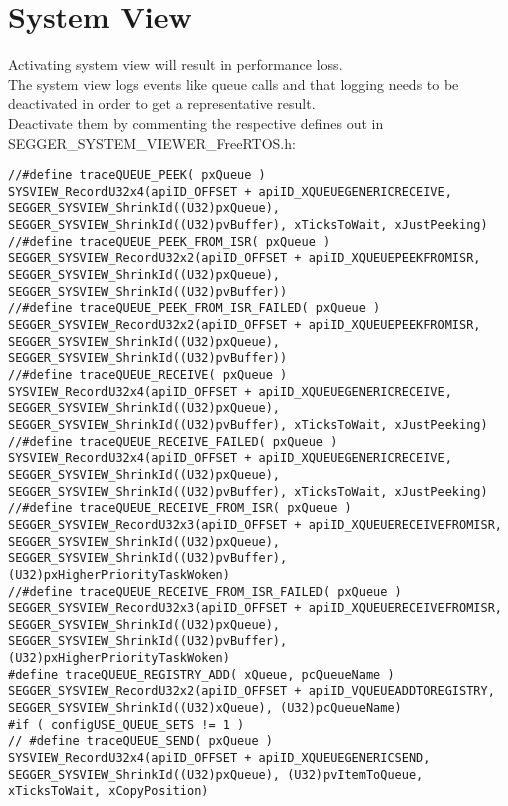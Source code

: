 \section{System View}
Activating system view will result in performance loss.\\
The system view logs events like queue calls and that logging needs to be deactivated in order to get a representative result.\\
Deactivate them by commenting the respective defines out in SEGGER\_SYSTEM\_VIEWER\_FreeRTOS.h:\\
\begin{lstlisting}
//#define traceQUEUE_PEEK( pxQueue )                                    SYSVIEW_RecordU32x4(apiID_OFFSET + apiID_XQUEUEGENERICRECEIVE, SEGGER_SYSVIEW_ShrinkId((U32)pxQueue), SEGGER_SYSVIEW_ShrinkId((U32)pvBuffer), xTicksToWait, xJustPeeking)
//#define traceQUEUE_PEEK_FROM_ISR( pxQueue )                           SEGGER_SYSVIEW_RecordU32x2(apiID_OFFSET + apiID_XQUEUEPEEKFROMISR, SEGGER_SYSVIEW_ShrinkId((U32)pxQueue), SEGGER_SYSVIEW_ShrinkId((U32)pvBuffer))
//#define traceQUEUE_PEEK_FROM_ISR_FAILED( pxQueue )                    SEGGER_SYSVIEW_RecordU32x2(apiID_OFFSET + apiID_XQUEUEPEEKFROMISR, SEGGER_SYSVIEW_ShrinkId((U32)pxQueue), SEGGER_SYSVIEW_ShrinkId((U32)pvBuffer))
//#define traceQUEUE_RECEIVE( pxQueue )                                 SYSVIEW_RecordU32x4(apiID_OFFSET + apiID_XQUEUEGENERICRECEIVE, SEGGER_SYSVIEW_ShrinkId((U32)pxQueue), SEGGER_SYSVIEW_ShrinkId((U32)pvBuffer), xTicksToWait, xJustPeeking)
//#define traceQUEUE_RECEIVE_FAILED( pxQueue )                          SYSVIEW_RecordU32x4(apiID_OFFSET + apiID_XQUEUEGENERICRECEIVE, SEGGER_SYSVIEW_ShrinkId((U32)pxQueue), SEGGER_SYSVIEW_ShrinkId((U32)pvBuffer), xTicksToWait, xJustPeeking)
//#define traceQUEUE_RECEIVE_FROM_ISR( pxQueue )                        SEGGER_SYSVIEW_RecordU32x3(apiID_OFFSET + apiID_XQUEUERECEIVEFROMISR, SEGGER_SYSVIEW_ShrinkId((U32)pxQueue), SEGGER_SYSVIEW_ShrinkId((U32)pvBuffer), (U32)pxHigherPriorityTaskWoken)
//#define traceQUEUE_RECEIVE_FROM_ISR_FAILED( pxQueue )                 SEGGER_SYSVIEW_RecordU32x3(apiID_OFFSET + apiID_XQUEUERECEIVEFROMISR, SEGGER_SYSVIEW_ShrinkId((U32)pxQueue), SEGGER_SYSVIEW_ShrinkId((U32)pvBuffer), (U32)pxHigherPriorityTaskWoken)
#define traceQUEUE_REGISTRY_ADD( xQueue, pcQueueName )                SEGGER_SYSVIEW_RecordU32x2(apiID_OFFSET + apiID_VQUEUEADDTOREGISTRY, SEGGER_SYSVIEW_ShrinkId((U32)xQueue), (U32)pcQueueName)
#if ( configUSE_QUEUE_SETS != 1 )
// #define traceQUEUE_SEND( pxQueue )                                    SYSVIEW_RecordU32x4(apiID_OFFSET + apiID_XQUEUEGENERICSEND, SEGGER_SYSVIEW_ShrinkId((U32)pxQueue), (U32)pvItemToQueue, xTicksToWait, xCopyPosition)

\end{lstlisting}
